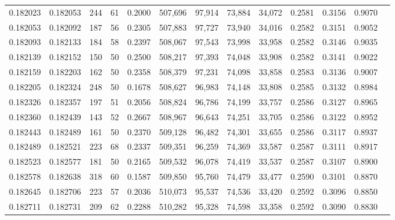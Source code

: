 \begin{tabular}{rrrrrrrrrrrrr}
0.182023 & 0.182053 &   244 &  61 &                                     0.2000 & 507,696 &  97,914 &  73,884 &  34,072 & 0.2581 & 0.3156 & 0.9070 \\
0.182053 & 0.182092 &   187 &  56 &                                     0.2305 & 507,883 &  97,727 &  73,940 &  34,016 & 0.2582 & 0.3151 & 0.9052 \\
0.182093 & 0.182133 &   184 &  58 &                                     0.2397 & 508,067 &  97,543 &  73,998 &  33,958 & 0.2582 & 0.3146 & 0.9035 \\
0.182139 & 0.182152 &   150 &  50 &                                     0.2500 & 508,217 &  97,393 &  74,048 &  33,908 & 0.2582 & 0.3141 & 0.9022 \\
0.182159 & 0.182203 &   162 &  50 &                                     0.2358 & 508,379 &  97,231 &  74,098 &  33,858 & 0.2583 & 0.3136 & 0.9007 \\
0.182205 & 0.182324 &   248 &  50 &                                     0.1678 & 508,627 &  96,983 &  74,148 &  33,808 & 0.2585 & 0.3132 & 0.8984 \\
0.182326 & 0.182357 &   197 &  51 &                                     0.2056 & 508,824 &  96,786 &  74,199 &  33,757 & 0.2586 & 0.3127 & 0.8965 \\
0.182360 & 0.182439 &   143 &  52 &                                     0.2667 & 508,967 &  96,643 &  74,251 &  33,705 & 0.2586 & 0.3122 & 0.8952 \\
0.182443 & 0.182489 &   161 &  50 &                                     0.2370 & 509,128 &  96,482 &  74,301 &  33,655 & 0.2586 & 0.3117 & 0.8937 \\
0.182489 & 0.182521 &   223 &  68 &                                     0.2337 & 509,351 &  96,259 &  74,369 &  33,587 & 0.2587 & 0.3111 & 0.8917 \\
0.182523 & 0.182577 &   181 &  50 &                                     0.2165 & 509,532 &  96,078 &  74,419 &  33,537 & 0.2587 & 0.3107 & 0.8900 \\
0.182578 & 0.182638 &   318 &  60 &                                     0.1587 & 509,850 &  95,760 &  74,479 &  33,477 & 0.2590 & 0.3101 & 0.8870 \\
0.182645 & 0.182706 &   223 &  57 &                                     0.2036 & 510,073 &  95,537 &  74,536 &  33,420 & 0.2592 & 0.3096 & 0.8850 \\
0.182711 & 0.182731 &   209 &  62 &                                     0.2288 & 510,282 &  95,328 &  74,598 &  33,358 & 0.2592 & 0.3090 & 0.8830 \\

\end{tabular}
